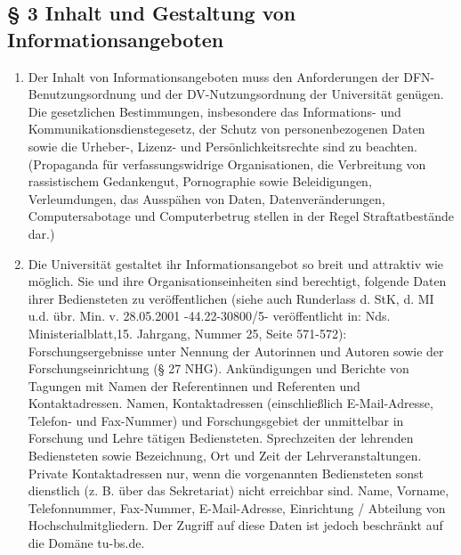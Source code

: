 \subsection*{§ 3 Inhalt und Gestaltung von Informationsangeboten}
\begin{enumerate}
\item  Der Inhalt von Informationsangeboten muss den Anforderungen der
  DFN-Benutzungsordnung und der DV-Nutzungsordnung der Universität
  genügen. Die gesetzlichen Bestimmungen, insbesondere das
  Informations- und Kommunikationsdienstegesetz, der Schutz von
  personenbezogenen Daten sowie die Urheber-, Lizenz- und
  Persönlichkeitsrechte sind zu beachten. (Propaganda für
  verfassungswidrige Organisationen, die Verbreitung von rassistischem
  Gedankengut, Pornographie sowie Beleidigungen, Verleumdungen, das
  Ausspähen von Daten, Datenveränderungen, Computersabotage und
  Computerbetrug stellen in der Regel Straftatbestände dar.)
\item Die Universität gestaltet ihr Informationsangebot so breit und attraktiv wie möglich. Sie und ihre Organisationseinheiten sind berechtigt, folgende Daten ihrer Bediensteten zu veröffentlichen (siehe auch Runderlass d. StK, d. MI u.d. übr. Min. v. 28.05.2001 -44.22-30800/5- veröffentlicht in: Nds. Ministerialblatt,15. Jahrgang, Nummer 25, Seite 571-572): 
Forschungsergebnisse unter Nennung der Autorinnen und Autoren sowie der Forschungseinrichtung (§ 27 NHG). 
Ankündigungen und Berichte von Tagungen mit Namen der Referentinnen und Referenten und Kontaktadressen. 
Namen, Kontaktadressen (einschließlich E-Mail-Adresse, Telefon- und Fax-Nummer) und Forschungsgebiet der unmittelbar in Forschung und Lehre tätigen Bediensteten. 
Sprechzeiten der lehrenden Bediensteten sowie Bezeichnung, Ort und Zeit der Lehrveranstaltungen. 
Private Kontaktadressen nur, wenn die vorgenannten Bediensteten sonst dienstlich (z. B. über das Sekretariat) nicht erreichbar sind. 
Name, Vorname, Telefonnummer, Fax-Nummer, E-Mail-Adresse, Einrichtung / Abteilung von Hochschulmitgliedern.
Der Zugriff auf diese Daten ist jedoch beschränkt auf die Domäne tu-bs.de. 



\end{enumerate}
